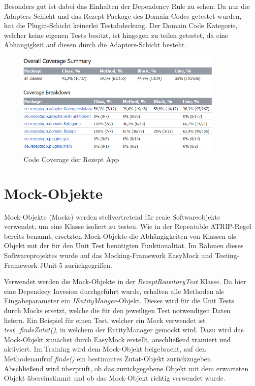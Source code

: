 Besonders gut ist dabei das Einhalten der Dependency Rule zu sehen: Da nur die Adapters-Schicht und das Rezept Package des Domain Codes getestet wurden, hat die Plugin-Schicht keinerlei Testabdeckung. Der Domain Code Kategorie, welcher keine eigenen Tests besitzt, ist hingegen zu teilen getestet, da eine Abhängigkeit auf diesen durch die Adapters-Schicht besteht.

\begin{figure}[ht]
	\centering
	\includegraphics[width=0.90\textwidth]{Bilder/CodeCoverage.png} 
	\caption{Code Coverage der Rezept App}
	\label{fig:CodeCoverageBild}
\end{figure}

\section{Mock-Objekte}
\label{Mocks}

Mock-Objekte (Mocks) werden stellvertretend für reale Softwareobjekte verwendet, um eine Klasse isoliert zu testen. Wie in der Repeatable ATRIP-Regel bereits benannt, ersetzten Mock-Objekte die Abhängigkeiten von Klassen als Objekt mit der für den Unit Test benötigten Funktionalität. Im Rahmen dieses Softwareprojektes wurde auf das Mocking-Framework EasyMock und Testing-Framework JUnit 5 zurückgegriffen.

Verwendet werden die Mock-Objekte in der \emph{RezeptReositoryTest} Klasse. Da hier eine Dependecy Invesion durchgeführt wurde, erhalten alle Methoden als Eingabeparameter ein \emph{IEntityManger}-Objekt. Dieses wird für die Unit Tests durch Mocks ersetzt, welche die für den jeweiligen Test notwendigen Daten liefern. Ein Beispiel für einen Test, welcher ein Mock verwendet ist \emph{test\_findeZutat()}, in welchem der EntityManager gemockt wird. Dazu wird das Mock-Objekt zunächst durch EasyMock erstellt, anschließend trainiert und aktiviert. Im Training wird dem Mock-Objekt beigebracht, auf den Methodenaufruf \emph{finde()} ein bestimmtes Zutat-Objekt zurückzugeben. Abschließend wird überprüft, ob das zurückgegebene Objekt mit dem erwarteten Objekt übereinstimmt und ob das Mock-Objekt richtig verwendet wurde. 
